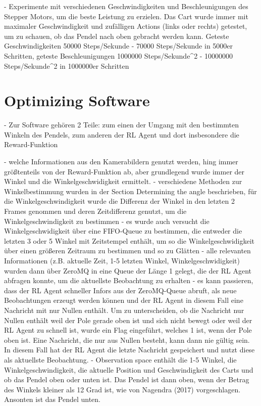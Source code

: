 - Experimente mit verschiedenen Geschwindigkeiten und Beschleunigungen des Stepper Motors, um die beste Leistung zu erzielen. Das Cart wurde immer mit maximaler Geschwindigkeit und zufälligen Actions (links oder rechts) getestet, um zu schauen, ob das Pendel nach oben gebracht werden kann. Geteste Geschwindigkeiten 50000 Steps/Sekunde - 70000 Steps/Sekunde in 5000er Schritten, geteste Beschleunigungen 1000000 Steps/Sekunde^2 - 10000000 Steps/Sekunde^2 in 1000000er Schritten

\section{Optimizing Software}
- Zur Software gehören 2 Teile: zum einen der Umgang mit den bestimmten Winkeln des Pendels, zum anderen der RL Agent und dort insbesondere die Reward-Funktion

- welche Informationen aus den Kamerabildern genutzt werden, hing immer größtenteils von der Reward-Funktion ab, aber grundlegend wurde immer der Winkel und die Winkelgeschwidigkeit ermittelt.
- verschiedene Methoden zur Winkelbestimmung wurden in der Section Determining the angle beschrieben, für die Winkelgeschwindigkeit wurde die Differenz der Winkel in den letzten 2 Frames genommen und deren Zeitdifferenz genutzt, um die Winkelgeschwindigkeit zu bestimmen
- es wurde auch versucht die Winkelgeschwidigkeit über eine FIFO-Queue zu bestimmen, die entweder die letzten 3 oder 5 Winkel mit Zeitstempel enthält, um so die Winkelgeschwidigkeit über einen größeren Zeitraum zu bestimmen und so zu Glätten
- alle relevanten Informationen (z.B. aktuelle Zeit, 1-5 letzten Winkel, Winkelgeschwidigkeit) wurden dann über ZeroMQ in eine Queue der Länge 1 gelegt, die der RL Agent abfragen konnte, um die aktuellste Beobachtung zu erhalten
- es kann passieren, dass der RL Agent schneller Infors aus der ZeroMQ-Queue abruft, als neue Beobachtungen erzeugt werden können und der RL Agent in diesem Fall eine Nachricht mit nur Nullen enthält. Um zu unterscheiden, ob die Nachricht nur Nullen enthält weil der Pole gerade oben ist und sich nicht bewegt oder weil der RL Agent zu schnell ist, wurde ein Flag eingeführt, welches 1 ist, wenn der Pole oben ist. Eine Nachricht, die nur aus Nullen besteht, kann dann nie gültig sein. In diesem Fall hat der RL Agent die letzte Nachricht gespeichert und nutzt diese als aktuellste Beobachtung.
- Observation space enthält die 1-5 Winkel, die Winkelgeschwindigkeit, die aktuelle Position und Geschwindigkeit des Carts und ob das Pendel oben oder unten ist. Das Pendel ist dann oben, wenn der Betrag des Winkels kleiner als 12 Grad ist, wie von Nagendra (2017) vorgeschlagen. Ansonten ist das Pendel unten.

